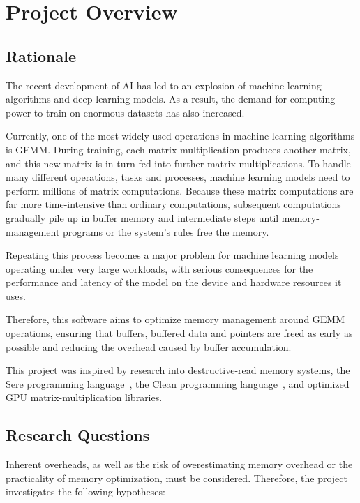 \documentclass[a4paper]{article}
\begin{document}
	
	\newpage
	
	\section{Project Overview}
	\label{sec:overview}
	
	\subsection{Rationale}
	
	The recent development of AI has led to an explosion of machine learning algorithms and deep learning models. As a result, the demand for computing power to train on enormous datasets has also increased.
	
	Currently, one of the most widely used operations in machine learning algorithms is GEMM. During training, each matrix multiplication produces another matrix, and this new matrix is in turn fed into further matrix multiplications. To handle many different operations, tasks and processes, machine learning models need to perform millions of matrix computations. Because these matrix computations are far more time-intensive than ordinary computations, subsequent computations gradually pile up in buffer memory and intermediate steps until memory-management programs or the system's rules free the memory.
	
	Repeating this process becomes a major problem for machine learning models operating under very large workloads, with serious consequences for the performance and latency of the model on the device and hardware resources it uses.
	
	Therefore, this software aims to optimize memory management around GEMM operations, ensuring that buffers, buffered data and pointers are freed as early as possible and reducing the overhead caused by buffer accumulation.
	
	This project was inspired by research into destructive-read memory systems, the Sere programming language~\cite{sere}, the Clean programming language~\cite{clean}, and optimized GPU matrix-multiplication libraries.
	
	\subsection{Research Questions}
	
	Inherent overheads, as well as the risk of overestimating memory overhead or the practicality of memory optimization, must be considered. Therefore, the project investigates the following hypotheses:
	
\end{document}
